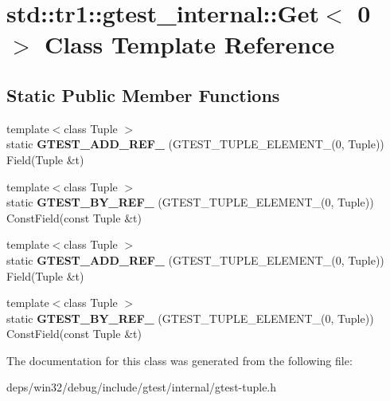 \hypertarget{classstd_1_1tr1_1_1gtest__internal_1_1_get_3_010_01_4}{}\section{std\+:\+:tr1\+:\+:gtest\+\_\+internal\+:\+:Get$<$ 0 $>$ Class Template Reference}
\label{classstd_1_1tr1_1_1gtest__internal_1_1_get_3_010_01_4}
\subsection*{Static Public Member Functions}
\begin{DoxyCompactItemize}
\item 
\hypertarget{classstd_1_1tr1_1_1gtest__internal_1_1_get_3_010_01_4_a74beca3869fddfe42ee608b7f4cacb96}{}{\footnotesize template$<$class Tuple $>$ }\\static {\bfseries G\+T\+E\+S\+T\+\_\+\+A\+D\+D\+\_\+\+R\+E\+F\+\_\+} (G\+T\+E\+S\+T\+\_\+\+T\+U\+P\+L\+E\+\_\+\+E\+L\+E\+M\+E\+N\+T\+\_\+(0, Tuple)) Field(Tuple \&t)\label{classstd_1_1tr1_1_1gtest__internal_1_1_get_3_010_01_4_a74beca3869fddfe42ee608b7f4cacb96}

\item 
\hypertarget{classstd_1_1tr1_1_1gtest__internal_1_1_get_3_010_01_4_a195b3853de45077f9a324c455f22d7e2}{}{\footnotesize template$<$class Tuple $>$ }\\static {\bfseries G\+T\+E\+S\+T\+\_\+\+B\+Y\+\_\+\+R\+E\+F\+\_\+} (G\+T\+E\+S\+T\+\_\+\+T\+U\+P\+L\+E\+\_\+\+E\+L\+E\+M\+E\+N\+T\+\_\+(0, Tuple)) Const\+Field(const Tuple \&t)\label{classstd_1_1tr1_1_1gtest__internal_1_1_get_3_010_01_4_a195b3853de45077f9a324c455f22d7e2}

\item 
\hypertarget{classstd_1_1tr1_1_1gtest__internal_1_1_get_3_010_01_4_a74beca3869fddfe42ee608b7f4cacb96}{}{\footnotesize template$<$class Tuple $>$ }\\static {\bfseries G\+T\+E\+S\+T\+\_\+\+A\+D\+D\+\_\+\+R\+E\+F\+\_\+} (G\+T\+E\+S\+T\+\_\+\+T\+U\+P\+L\+E\+\_\+\+E\+L\+E\+M\+E\+N\+T\+\_\+(0, Tuple)) Field(Tuple \&t)\label{classstd_1_1tr1_1_1gtest__internal_1_1_get_3_010_01_4_a74beca3869fddfe42ee608b7f4cacb96}

\item 
\hypertarget{classstd_1_1tr1_1_1gtest__internal_1_1_get_3_010_01_4_a195b3853de45077f9a324c455f22d7e2}{}{\footnotesize template$<$class Tuple $>$ }\\static {\bfseries G\+T\+E\+S\+T\+\_\+\+B\+Y\+\_\+\+R\+E\+F\+\_\+} (G\+T\+E\+S\+T\+\_\+\+T\+U\+P\+L\+E\+\_\+\+E\+L\+E\+M\+E\+N\+T\+\_\+(0, Tuple)) Const\+Field(const Tuple \&t)\label{classstd_1_1tr1_1_1gtest__internal_1_1_get_3_010_01_4_a195b3853de45077f9a324c455f22d7e2}

\end{DoxyCompactItemize}


The documentation for this class was generated from the following file\+:\begin{DoxyCompactItemize}
\item 
deps/win32/debug/include/gtest/internal/gtest-\/tuple.\+h\end{DoxyCompactItemize}
